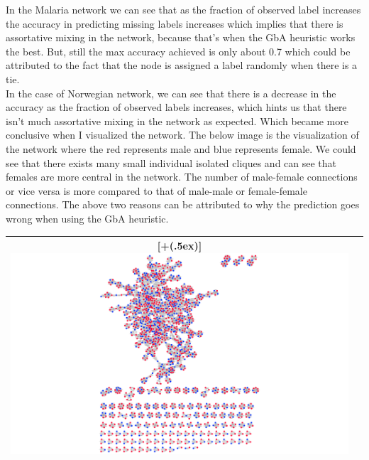 \documentclass{article}
\newcommand*{\addheight}[2][.5ex]{%
  \raisebox{0pt}[\dimexpr\height+(#1)\relax]{#2}%
}
\begin{document}
\begin{enumerate}[label=(\alph*)]
In the Malaria network we can see that as the fraction of observed label increases the accuracy in predicting missing labels increases which implies that there is assortative mixing in the network, because that's when the GbA heuristic works the best. But, still the max accuracy achieved is only about 0.7 which could be attributed to the fact that the node is assigned a label randomly when there is a tie.\\

In the case of Norwegian network, we can see that there is a decrease in the accuracy as the fraction of observed labels increases, which hints us that there isn't much assortative mixing in the network as expected. Which became more conclusive when I visualized the network. The below image is the visualization of the network where the red represents male and blue represents female. We could see that there exists many small individual isolated cliques and can see that females are more central in the network. The number of male-female connections or vice versa is more compared to that of male-male or female-female connections. The above two reasons can be attributed to why the prediction goes wrong when using the GbA heuristic.

\begin{table}[H]
\centering
\begin{tabular}{|c|c|}
	\hline
	\addheight{\includegraphics[width=160mm]{images/visual.png}} \\
	\hline
\end{tabular}
\end{table}


\end{enumerate}
\end{document}
